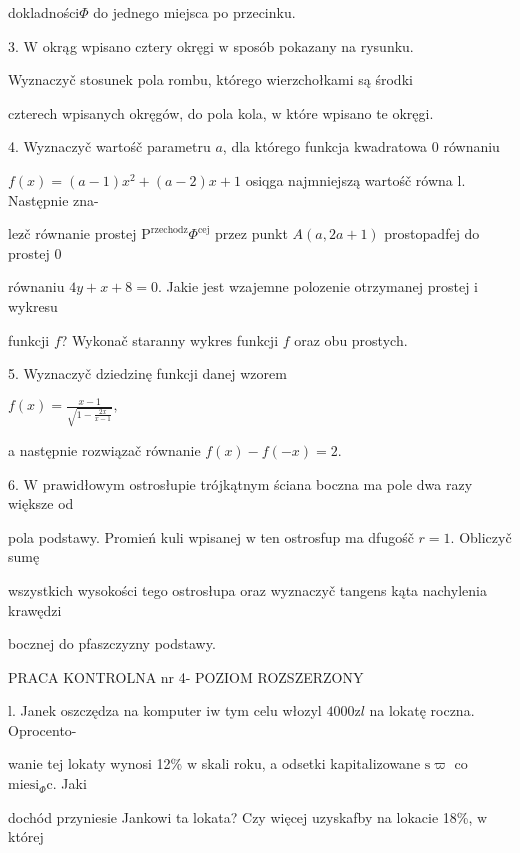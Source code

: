 \documentclass[a4paper,12pt]{article}
\begin{document}
dokladności$\Phi$ do jednego miejsca po przecinku.

3. $\mathrm{W}$ okrąg wpisano cztery okręgi $\mathrm{w}$ sposób pokazany na rysunku.

Wyznaczyč stosunek pola rombu, którego wierzchołkami są środki

czterech wpisanych okręgów, do pola kola, $\mathrm{w}$ które wpisano te okręgi.

4. Wyznaczyč wartośč parametru $a$, dla którego funkcja kwadratowa $0$ równaniu

$f(x) = (a-1)x^{2}+(a-2)x+1$ osiqga najmniejszą wartośč równa l. Następnie zna-

lez$\acute{}$č równanie prostej $\mathrm{P}^{\mathrm{r}\mathrm{z}\mathrm{e}\mathrm{c}\mathrm{h}\mathrm{o}\mathrm{d}\mathrm{z}}\Phi^{\mathrm{c}\mathrm{e}\mathrm{j}}$ przez punkt $A(a,2a+1)$ prostopadfej do prostej $0$

równaniu $4y+x+8=0$. Jakie jest wzajemne polozenie otrzymanej prostej $\mathrm{i}$ wykresu

funkcji $f$? Wykonač staranny wykres funkcji $f$ oraz obu prostych.

5. Wyznaczyč dziedzinę funkcji danej wzorem

$f(x)=\displaystyle \frac{x-1}{\sqrt{1-\frac{2x}{x-1}}},$

a następnie rozwiązač równanie $f(x)-f(-x)=2.$

6. $\mathrm{W}$ prawidłowym ostrosłupie trójkątnym ściana boczna ma pole dwa razy większe od

pola podstawy. Promień kuli wpisanej $\mathrm{w}$ ten ostrosfup ma dfugośč $r=1$. Obliczyč sumę

wszystkich wysokości tego ostrosłupa oraz wyznaczyč tangens kąta nachylenia krawędzi

bocznej do pfaszczyzny podstawy.





PRACA KONTROLNA nr 4- POZIOM ROZSZERZONY

l. Janek oszczędza na komputer $\mathrm{i}\mathrm{w}$ tym celu włozyl $4000\mathrm{z}l$ na lokatę roczna. Oprocento-

wanie tej lokaty wynosi 12\% $\mathrm{w}$ skali roku, a odsetki kapitalizowane $\mathrm{s}\varpi$ co $\mathrm{m}\mathrm{i}\mathrm{e}\mathrm{s}\mathrm{i}_{\Phi}\mathrm{c}$. Jaki

dochód przyniesie Jankowi ta lokata? Czy więcej uzyskafby na lokacie 18\%, $\mathrm{w}$ której
\end{document}
